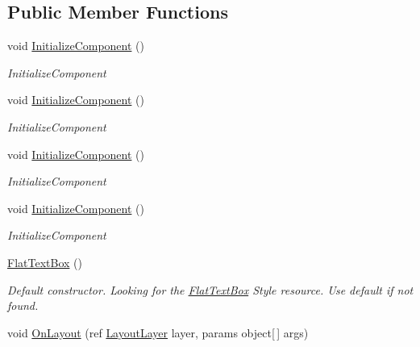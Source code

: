 \subsection*{Public Member Functions}
\begin{DoxyCompactItemize}
\item 
void \mbox{\hyperlink{class_wpf_handler_1_1_u_i_1_1_controls_1_1_flat_text_box_a2f6880285eef90455e25c7f3c7fafa56}{Initialize\+Component}} ()
\begin{DoxyCompactList}\small\item\em Initialize\+Component \end{DoxyCompactList}\item 
void \mbox{\hyperlink{class_wpf_handler_1_1_u_i_1_1_controls_1_1_flat_text_box_a2f6880285eef90455e25c7f3c7fafa56}{Initialize\+Component}} ()
\begin{DoxyCompactList}\small\item\em Initialize\+Component \end{DoxyCompactList}\item 
void \mbox{\hyperlink{class_wpf_handler_1_1_u_i_1_1_controls_1_1_flat_text_box_a2f6880285eef90455e25c7f3c7fafa56}{Initialize\+Component}} ()
\begin{DoxyCompactList}\small\item\em Initialize\+Component \end{DoxyCompactList}\item 
void \mbox{\hyperlink{class_wpf_handler_1_1_u_i_1_1_controls_1_1_flat_text_box_a2f6880285eef90455e25c7f3c7fafa56}{Initialize\+Component}} ()
\begin{DoxyCompactList}\small\item\em Initialize\+Component \end{DoxyCompactList}\item 
\mbox{\hyperlink{class_wpf_handler_1_1_u_i_1_1_controls_1_1_flat_text_box_aefe884a51110f8fc9546ce2c86fcf574}{Flat\+Text\+Box}} ()
\begin{DoxyCompactList}\small\item\em Default constructor. Looking for the {\ttfamily \mbox{\hyperlink{class_wpf_handler_1_1_u_i_1_1_controls_1_1_flat_text_box}{Flat\+Text\+Box}}} Style resource. Use default if not found. \end{DoxyCompactList}\item 
void \mbox{\hyperlink{class_wpf_handler_1_1_u_i_1_1_controls_1_1_flat_text_box_a9885e81c438caeec3448c99796503a71}{On\+Layout}} (ref \mbox{\hyperlink{class_wpf_handler_1_1_u_i_1_1_auto_layout_1_1_layout_layer}{Layout\+Layer}} layer, params object\mbox{[}$\,$\mbox{]} args)

\end{DoxyCompactItemize}
